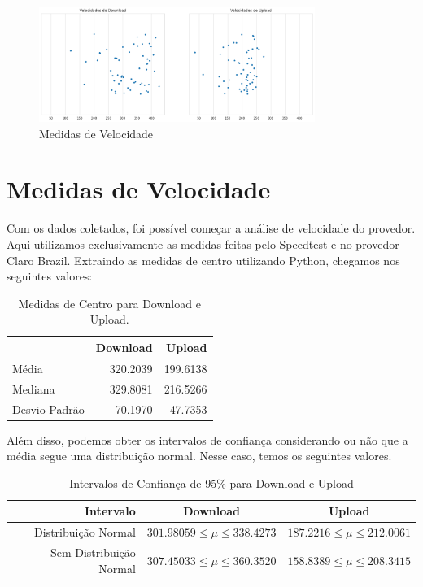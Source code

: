 \documentclass{report}
\begin{document}
\begin{figure}[h]
    \caption{Medidas de Velocidade}
    \centering
    \includegraphics[width=0.8\textwidth]{datapoints.png}
\end{figure}

\newpage
\newpage


\section{Medidas de Velocidade}

Com os dados coletados, foi possível começar a análise de velocidade do provedor. Aqui utilizamos exclusivamente as medidas feitas pelo Speedtest e no provedor Claro Brazil. Extraindo as medidas de centro utilizando Python, chegamos nos seguintes valores:

\begin{table}[!h]
    \begin{center}
    \caption{Medidas de Centro para Download e Upload.}
    \begin{tabular}{lrr}
        \toprule
        {}            & Download  & Upload   \\
        \midrule
        Média         & 320.2039  & 199.6138 \\
        Mediana       & 329.8081  & 216.5266 \\
        Desvio Padrão & 70.1970   & 47.7353  \\
        \bottomrule
    \end{tabular}
\end{center}
\end{table}


Além disso, podemos obter os intervalos de confiança considerando ou não que a média segue uma distribuição normal. Nesse caso, temos os seguintes valores.

\begin{table}[!h]
    \begin{center}
    \caption{Intervalos de Confiança de 95\% para Download e Upload}
    \begin{tabular}{rcc}
        \toprule
        Intervalo            & Download  & Upload   \\
        \midrule
        Distribuição Normal & $301.98059 \leq \mu \leq 338.4273$ & $187.2216 \leq \mu \leq 212.0061$ \\
        Sem Distribuição Normal & $307.45033 \leq \mu \leq 360.3520$ & $158.8389 \leq \mu \leq 208.3415$ \\
        \bottomrule
    \end{tabular}
\end{center}
\end{table}
\end{document}
